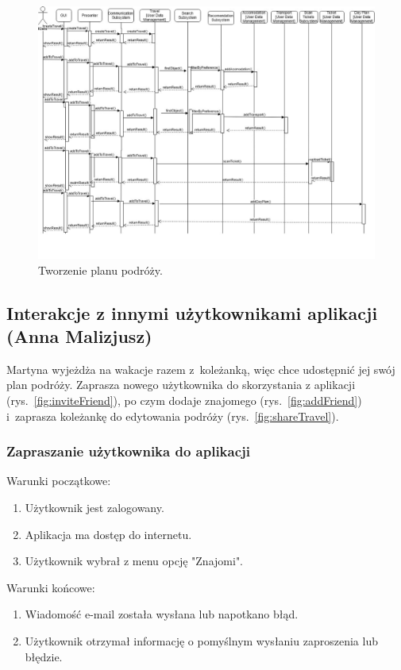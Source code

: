 \documentclass[10pt,twoside,a4paper]{report}
\begin{document}
\noindent\newline
\begin{figure}[h]
\centering
\includegraphics[width=\linewidth]{addTravel}
\caption{Tworzenie planu podróży.}
\label{fig:addTravel}
\end{figure}

\FloatBarrier
\subsection{Interakcje z innymi użytkownikami aplikacji (Anna Malizjusz)}
\par Martyna wyjeżdża na wakacje razem z~koleżanką, więc chce udostępnić jej swój plan podróży. Zaprasza nowego użytkownika do skorzystania z aplikacji (rys.~\ref{fig:inviteFriend}), po czym dodaje znajomego (rys.~\ref{fig:addFriend}) i~zaprasza koleżankę do edytowania podróży (rys.~\ref{fig:shareTravel}).
\FloatBarrier
\subsubsection{Zapraszanie użytkownika do aplikacji}

\noindent Warunki początkowe:
\begin{enumerate}
  \item Użytkownik jest zalogowany.
  \item Aplikacja ma dostęp do internetu.
  \item Użytkownik wybrał z menu opcję "Znajomi".
\end{enumerate}
\par
\noindent\newline
Warunki końcowe:
\begin{enumerate}
  \item Wiadomość e-mail została wysłana lub napotkano błąd.
  \item Użytkownik otrzymał informację o pomyślnym wysłaniu zaproszenia lub błędzie.
\end{enumerate}
\end{document}
